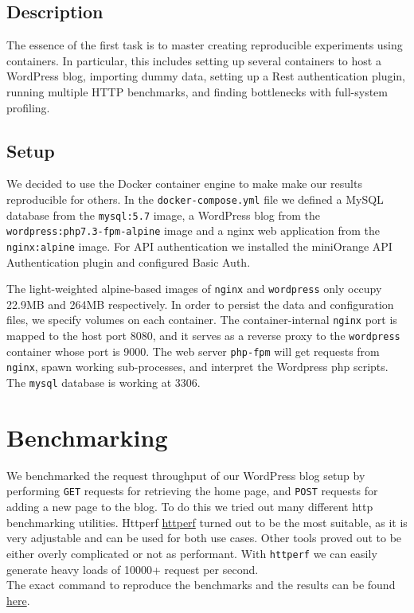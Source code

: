 \subsection{Description}

The essence of the first task is to master creating reproducible experiments using containers. In particular, this includes setting up several containers to host a WordPress blog, importing dummy data, setting up a Rest authentication plugin, running multiple HTTP benchmarks, and finding bottlenecks with full-system profiling. 

\subsection{Setup}

We decided to use the Docker container engine to make make our results reproducible for others. In the \texttt{docker-compose.yml} file we defined a MySQL database from the \texttt{mysql:5.7} image, a WordPress blog from the \texttt{wordpress:php7.3-fpm-alpine} image and a nginx web application from the \texttt{nginx:alpine} image.
For API authentication we installed the miniOrange API Authentication plugin and configured Basic Auth.

The light-weighted alpine-based images of \texttt{nginx} and \texttt{wordpress} only occupy 22.9MB and 264MB respectively. In order to persist the data and configuration files, we specify volumes on each container. The container-internal \texttt{nginx} port is mapped to the host port 8080, and it serves as a reverse proxy to the \texttt{wordpress} container whose port is 9000. The web server \texttt{php-fpm} will get requests from \texttt{nginx}, spawn working sub-processes, and interpret the Wordpress php scripts. The \texttt{mysql} database is working at 3306.



\section{Benchmarking}

We benchmarked the request throughput of our WordPress blog setup by performing \texttt{GET} requests for retrieving the home page, and \texttt{POST} requests for adding a new page to the blog. To do this we tried out many different http benchmarking utilities. Httperf  \href{https://github.com/httperf/httperf}{httperf} turned out to be the most suitable, as it is very adjustable and can be used for both use cases. Other tools proved out to be either overly complicated or not as performant. With \texttt{httperf} we can easily generate heavy loads of 10000+ request per second. \\
The exact command to reproduce the benchmarks and the results can be found \href{https://github.com/danbachar/swiss-knife/blob/master/task1/benchmark/README.md}{here}.

